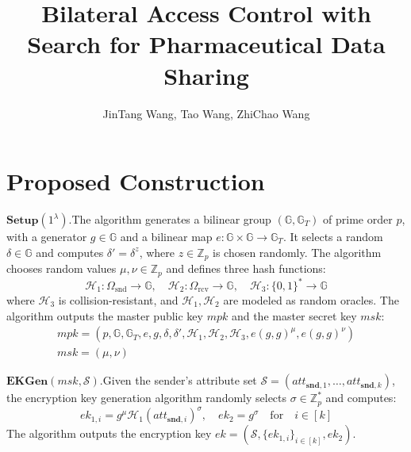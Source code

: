 \documentclass[runningheads]{llncs}
\begin{document}
%
\title{Bilateral Access Control with Search for Pharmaceutical Data Sharing}
%
%
\author{JinTang Wang, Tao Wang, ZhiChao Wang}

%
%
\maketitle              %
%
\section{Proposed Construction}
$\mathbf{Setup}(1^\lambda).$The algorithm generates a bilinear group $(\mathbb{G}, \mathbb{G}_T)$ of prime order $p$, with a generator $g \in \mathbb{G}$ and a bilinear map $e: \mathbb{G} \times \mathbb{G} \rightarrow \mathbb{G}_T$. It selects a random $\delta \in \mathbb{G}$ and computes $\delta' = \delta^z$, where $z \in \mathbb{Z}_p$ is chosen randomly. The algorithm chooses random values $\mu, \nu \in \mathbb{Z}_p$ and defines three hash functions:
$$
\mathcal{H}_1: \Omega_{\mathrm{snd}} \rightarrow \mathbb{G}, \quad \mathcal{H}_2: \Omega_{\mathrm{rcv}} \rightarrow \mathbb{G}, \quad \mathcal{H}_3: \{0,1\}^* \rightarrow \mathbb{G}
$$
where $\mathcal{H}_3$ is collision-resistant, and $\mathcal{H}_1, \mathcal{H}_2$ are modeled as random oracles. The algorithm outputs the master public key $mpk$ and the master secret key $msk$:
\begin{gather*}
mpk = (p, \mathbb{G}, \mathbb{G}_T, e, g, \delta, \delta', \mathcal{H}_1, \mathcal{H}_2, \mathcal{H}_3, e(g,g)^\mu, e(g,g)^\nu)\\
msk = (\mu, \nu)
\end{gather*}

$\mathbf{EKGen}(msk, \mathcal{S}).$Given the sender's attribute set $\mathcal{S} = (att_{\mathbf{snd},1}, \ldots, att_{\mathbf{snd},k})$, the encryption key generation algorithm randomly selects $\sigma \in \mathbb{Z}_p^*$ and computes:
$$ek_{1,i} = g^\mu \mathcal{H}_1(att_{\mathbf{snd},i})^\sigma, \quad ek_2 = g^\sigma \quad \text{for} \quad i \in [k]$$
The algorithm outputs the encryption key $ ek = (\mathcal{S}, \{ ek_{1,i} \}_{i \in [k]}, ek_2) $.
\end{document}
